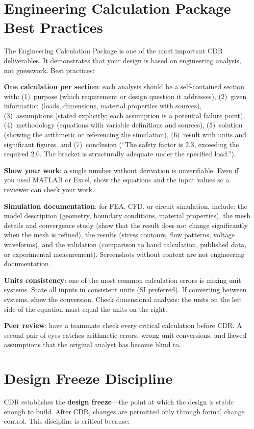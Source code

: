 \section{Engineering Calculation Package Best Practices}
The Engineering Calculation Package is one of the most important CDR deliverables. It demonstrates that your design is based on engineering analysis, not guesswork. Best practices:

\textbf{One calculation per section}: each analysis should be a self-contained section with: (1)~purpose (which requirement or design question it addresses), (2)~given information (loads, dimensions, material properties with sources), (3)~assumptions (stated explicitly; each assumption is a potential failure point), (4)~methodology (equations with variable definitions and sources), (5)~solution (showing the arithmetic or referencing the simulation), (6)~result with units and significant figures, and (7)~conclusion (``The safety factor is 2.3, exceeding the required 2.0. The bracket is structurally adequate under the specified load.'').

\textbf{Show your work}: a single number without derivation is unverifiable. Even if you used MATLAB or Excel, show the equations and the input values so a reviewer can check your work.

\textbf{Simulation documentation}: for FEA, CFD, or circuit simulation, include: the model description (geometry, boundary conditions, material properties), the mesh details and convergence study (show that the result does not change significantly when the mesh is refined), the results (stress contours, flow patterns, voltage waveforms), and the validation (comparison to hand calculation, published data, or experimental measurement). Screenshots without context are not engineering documentation.

\textbf{Units consistency}: one of the most common calculation errors is mixing unit systems. State all inputs in consistent units (SI preferred). If converting between systems, show the conversion. Check dimensional analysis: the units on the left side of the equation must equal the units on the right.

\textbf{Peer review}: have a teammate check every critical calculation before CDR. A second pair of eyes catches arithmetic errors, wrong unit conversions, and flawed assumptions that the original analyst has become blind to.



\section{Design Freeze Discipline}
CDR establishes the \textbf{design freeze}---the point at which the design is stable enough to build. After CDR, changes are permitted only through formal change control. This discipline is critical because:

